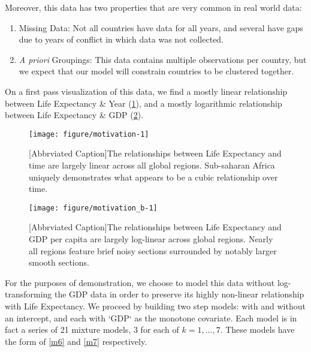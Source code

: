 \documentclass[10pt]{olplainarticle}\usepackage[]{graphicx}\usepackage[]{color}
\makeatletter
\def\maxwidth{ %
  \ifdim\Gin@nat@width>\linewidth
    \linewidth
  \else
    \Gin@nat@width
  \fi
}
\newenvironment{knitrout}{}{} %
\makeatother
\begin{document}
Moreover, this data has two properties that are very common in real world data:
\begin{enumerate}[noitemsep] 
  \item Missing Data: Not all countries have data for all years, and several have gaps due to years of conflict in which data was not collected.
  \item \emph{A priori} Groupings: This data contains multiple observations per country, but we expect that our model will constrain countries to be clustered together. 
\end{enumerate}

On a first pass visualization of this data, we find a mostly linear relationship between Life Expectancy \& Year (\ref{lexy}), and a mostly logarithmic relationship between Life Expectancy \& GDP (\ref{lexgdp}). 

\begin{figure}
\begin{knitrout}
\color{fgcolor}

{\centering \texttt{[image: figure/motivation-1]} 

}



\end{knitrout}

[Abbrviated Caption]{The relationships between Life Expectancy and time are largely linear across all global regions. Sub-saharan Africa uniquely demonstrates what appears to be a cubic relationship over time.} \label{lexy}
\end{figure}

\begin{figure}
\begin{knitrout}
\color{fgcolor}

{\centering \texttt{[image: figure/motivation\_b-1]} 

}



\end{knitrout}
[Abbrviated Caption]{The relationships between Life Expectancy and GDP per capita are largely log-linear across global regions. Nearly all regions feature brief noisy sections surrounded by notably larger smooth sections.}  \label{lexgdp}
\end{figure}

For the purposes of demonstration, we choose to model this data without log-transforming the GDP data in order to preserve its highly non-linear relationship with Life Expectancy. We proceed by building two step models: with and without an intercept, and each with `GDP` as the monotone covariate. Each model is in fact a series of 21 mixture models, 3 for each of $k = 1,...,7$. These models have the form of \ref{m6} and \ref{m7} respectively.
\end{document}
